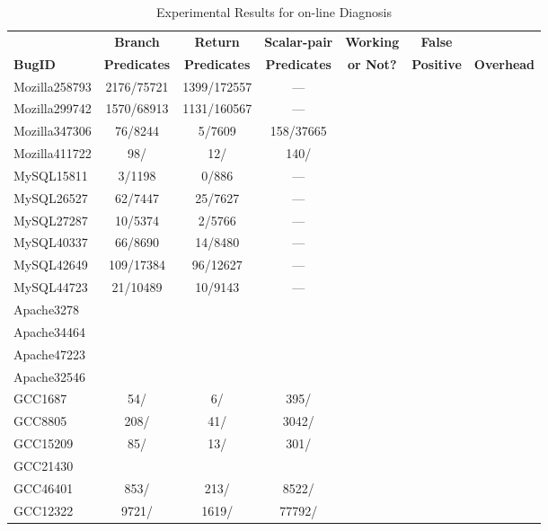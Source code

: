 \begin{table*}[h!]
  \centering
  \small
  \begin{tabular}{lcccccc}
    \toprule
               &  {\bf Branch}  &{\bf Return}    &{\bf Scalar-pair}   & {\bf Working}& {\bf False}    &                \\
    {\bf BugID}&{\bf Predicates}&{\bf Predicates}&{\bf Predicates}    & {\bf or Not?}&{\bf Positive}  &{\bf Overhead} \\
    \midrule
    Mozilla258793          &  2176/75721      &   1399/172557     &  ---         &  & &  \\
    Mozilla299742          &  1570/68913      &   1131/160567     &  ---         &  & &  \\
    Mozilla347306          &  76/8244         &   5/7609          &  158/37665   &  & &  \\
    Mozilla411722          &  98/             &   12/             &  140/    &         &  &  \\
    \midrule
    MySQL15811             & 3/1198     & 0/886     &  ---   &  & &  \\
    MySQL26527             & 62/7447    & 25/7627    &  ---  &  & &  \\
    MySQL27287             & 10/5374    & 2/5766    &  ---   &  & &  \\
    MySQL40337             & 66/8690    & 14/8480   &  ---   &   & &  \\
    MySQL42649             & 109/17384  & 96/12627 &  ---    &   & &  \\
    MySQL44723             & 21/10489   & 10/9143   &  ---   &  & &  \\
    \midrule
    Apache3278             &    &  &    &  & &  \\
    Apache34464            &    &  &    &  & &  \\
    Apache47223            &    &  &    &  & &  \\
    Apache32546            &    &  &    &  & &  \\
    \midrule
    GCC1687                & 54/   & 6/ & 395/   &  & &  \\
    GCC8805                & 208/  & 41/    &   3042/     &  & &  \\
    GCC15209               & 85/   & 13/ & 301/   &  & &  \\
    GCC21430               &   &  &    &  & &  \\
    GCC46401               & 853/ & 213/  & 8522/   &  & &  \\
    GCC12322               & 9721/   & 1619/  & 77792/   &  & &  \\
    \bottomrule
   \end{tabular}
  \nocaptionrule
  \caption{Experimental Results for on-line Diagnosis}
  \label{tab:on-line}
\end{table*}

